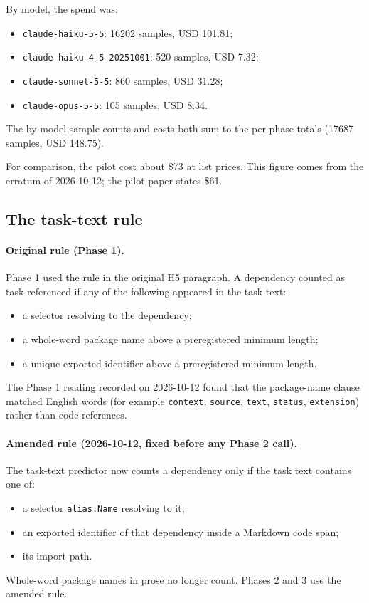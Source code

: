 By model, the spend was:
\begin{itemize}
\item \texttt{claude-haiku-5-5}: 16202 samples, USD 101.81;
\item \texttt{claude-haiku-4-5-20251001}: 520 samples, USD 7.32;
\item \texttt{claude-sonnet-5-5}: 860 samples, USD 31.28;
\item \texttt{claude-opus-5-5}: 105 samples, USD 8.34.
\end{itemize}

The by-model sample counts and costs both sum to the per-phase totals (17687 samples, USD 148.75).

For comparison, the pilot cost about \$73 at list prices. This figure comes from the erratum of 2026-10-12; the pilot paper states \$61.

\subsection{The task-text rule}\label{sec:taskrule}

\paragraph{Original rule (Phase 1).} Phase 1 used the rule in the original H5 paragraph. A dependency counted as task-referenced if any of the following appeared in the task text:
\begin{itemize}
\item a selector resolving to the dependency;
\item a whole-word package name above a preregistered minimum length;
\item a unique exported identifier above a preregistered minimum length.
\end{itemize}

The Phase 1 reading recorded on 2026-10-12 found that the package-name clause matched English words (for example \texttt{context}, \texttt{source}, \texttt{text}, \texttt{status}, \texttt{extension}) rather than code references.

\paragraph{Amended rule (2026-10-12, fixed before any Phase 2 call).} The task-text predictor now counts a dependency only if the task text contains one of:
\begin{itemize}
\item a selector \texttt{alias.Name} resolving to it;
\item an exported identifier of that dependency inside a Markdown code span;
\item its import path.
\end{itemize}
Whole-word package names in prose no longer count. Phases 2 and 3 use the amended rule.

